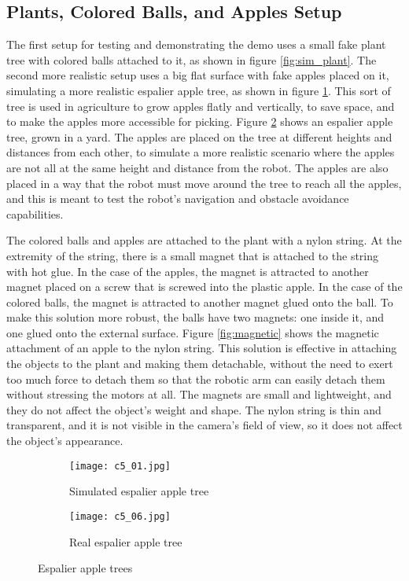 \subsection{Plants, Colored Balls, and Apples Setup}

The first setup for testing and demonstrating the demo uses a small fake plant tree with colored balls attached to it,
as shown in figure \ref{fig:sim_plant}.
The second more realistic setup uses a big flat surface with fake apples placed on it, simulating a more realistic
espalier apple tree, as shown in figure \ref{fig:sim_espalier}.
This sort of tree is used in agriculture to grow apples flatly and vertically, to save space,
and to make the apples more accessible for picking. Figure \ref{fig:real_espalier} shows an espalier apple tree,
grown in a yard.
The apples are placed on the tree at different heights and distances
from each other, to simulate a more realistic scenario where the apples are not all at the same height and distance
from the robot. The apples are also placed in a way that the robot must move around the tree to reach all the apples,
and this is meant to test the robot's navigation and obstacle avoidance capabilities.

The colored balls and apples are attached to the plant with a nylon string. At the extremity of the string, there is a small
magnet that is attached to the string with hot glue. In the case of the apples, the magnet is attracted to another magnet
placed on a screw that is screwed into the plastic apple. In the case of the colored balls, the magnet is attracted
to another magnet glued onto the ball. To make this solution more robust, the balls have two magnets: one inside it,
and one glued onto the external surface. Figure \ref{fig:magnetic} shows the magnetic attachment of an apple to the nylon string.
This solution is effective in attaching the objects to the plant and making them detachable, 
without the need to exert too much force to detach them so that the robotic arm can easily detach them
without stressing the motors at all. The magnets are small and lightweight, and they do not affect the object's weight and shape.
The nylon string is thin and transparent, and it is not visible in the camera's field of view, 
so it does not affect the object's appearance.

\begin{figure}[t]
    \centering
    \begin{subfigure}{0.45\textwidth}
        \texttt{[image: c5\_01.jpg]}
        \caption{Simulated espalier apple tree}
        \label{fig:sim_espalier}
    \end{subfigure}
    \hfill %
    \begin{subfigure}{0.5\textwidth}
        \texttt{[image: c5\_06.jpg]}
        \caption{Real espalier apple tree}
        \label{fig:real_espalier}
    \end{subfigure}
    \caption{Espalier apple trees}
    \label{fig:plants}
\end{figure}

